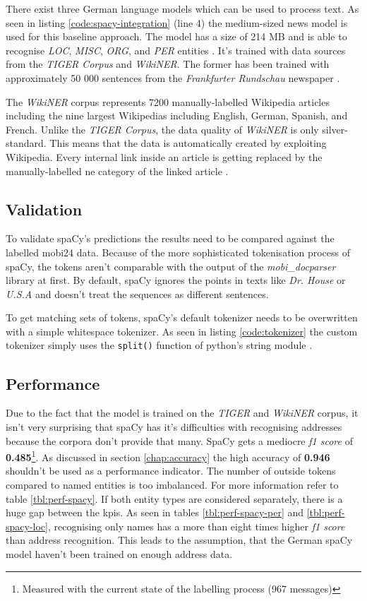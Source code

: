 There exist three German language models which can be used to process text. As seen in listing \ref{code:spacy-integration} (line 4) the medium-sized
news model is used for this baseline approach. The model has a size of 214 MB and is able to recognise \emph{LOC}, \emph{MISC}, \emph{ORG}, and
\emph{PER} entities \cite{gh-spacy}. It's trained with data sources from the \emph{TIGER Corpus} and \emph{WikiNER}. The former has been trained with
approximately 50 000 sentences from the \emph{Frankfurter Rundschau} newspaper \cite{tiger}.

The \emph{WikiNER} corpus represents 7200 manually-labelled Wikipedia articles including the nine largest Wikipedias including English, German, Spanish,
and French. Unlike the \emph{TIGER Corpus}, the data quality of \emph{WikiNER} is only silver-standard. This means that the data is automatically created
by exploiting Wikipedia. Every internal link inside an article is getting replaced by the manually-labelled \acrshort{ne} category of the linked article \cite{Nothman}.

\subsection{Validation}

To validate spaCy's predictions the results need to be compared against the labelled \gls{mobi24} data. Because of the more sophisticated tokenisation
process of spaCy, the tokens aren't comparable with the output of the \emph{mobi\_docparser} library at first. By default, spaCy ignores the points in texts like \emph{Dr. House} or \emph{U.S.A} and doesn't treat the sequences as different sentences.

To get matching sets of tokens, spaCy's default tokenizer needs to be overwritten with a simple whitespace tokenizer.
As seen in listing \ref{code:tokenizer} the custom tokenizer simply uses the \verb|split()| function of
python's string module \cite{spacy-tok}.

\subsection{Performance}

Due to the fact that the model is trained on the \emph{TIGER} and \emph{WikiNER} corpus, it isn't very surprising that spaCy has it's difficulties with
recognising addresses because the corpora don't provide that many. SpaCy gets a mediocre \emph{f1 score} of \textbf{0.485}\footnote{Measured with the
current state of the labelling process (967 messages)}. As discussed in section \ref{chap:accuracy} the high accuracy of \textbf{0.946} shouldn't be used
as a performance indicator. The number of outside tokens compared to named entities is too imbalanced. For more information refer to table \ref{tbl:perf-spacy}.
If both entity types are considered separately, there is a huge gap between the \acrshort{kpi}s. As seen in tables \ref{tbl:perf-spacy-per} and
\ref{tbl:perf-spacy-loc}, recognising only names has a more than eight times higher \emph{f1 score} than address recognition. This leads to the assumption, that the German spaCy model haven't been trained on enough address data. 

